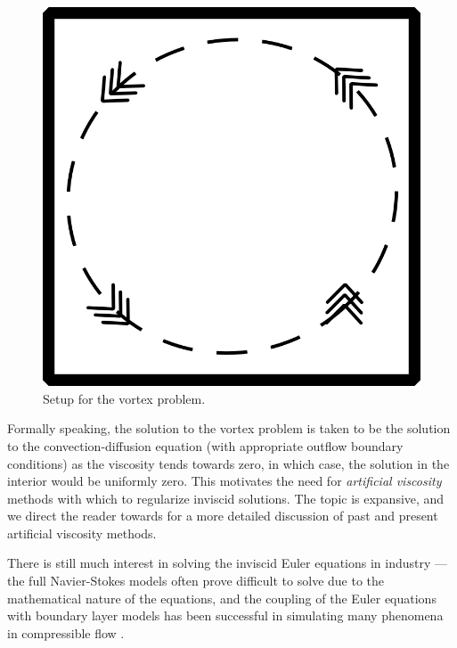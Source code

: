 \begin{figure}[!h]
\centering
\includegraphics[scale = .22]{figs/convCirc.png}
\caption{Setup for the vortex problem.}
\label{fig:convCirc}
\end{figure}
Formally speaking, the solution to the vortex problem is taken to be the solution to the convection-diffusion equation (with appropriate outflow boundary conditions) as the viscosity tends towards zero, in which case, the solution in the interior would be uniformly zero.  This motivates the need for \emph{artificial viscosity} methods with which to regularize inviscid solutions.  The topic is expansive, and we direct the reader towards \cite{Barter} for a more detailed discussion of past and present artificial viscosity methods.

There is still much interest in solving the inviscid Euler equations in industry --- the full Navier-Stokes models often prove difficult to solve due to the mathematical nature of the equations, and the coupling of the Euler equations with boundary layer models has been successful in simulating many phenomena in compressible flow \cite{BoeingDrela}.  

